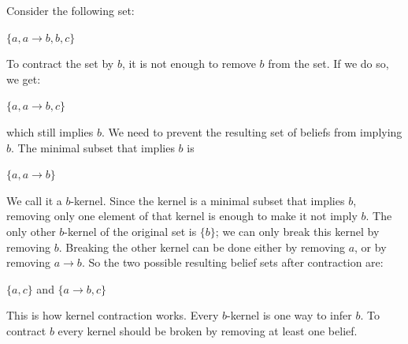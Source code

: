 \documentclass{sfuthesis}
\theoremstyle{plain}
\theoremstyle{definition}
\begin{document}
Consider the following set:
\begin{center}
$ \lbrace a, a \rightarrow b, b, c \rbrace $
\end{center}
To contract the set by $b$, it is not enough to remove $b$ from the set. If we do so, we get:
\begin{center}
$ \lbrace a, a \rightarrow b, c \rbrace $
\end{center}
which still implies $b$. We need to prevent the resulting set of beliefs from implying $b$. The minimal subset that implies $b$ is 
\begin{center}
$ \lbrace a, a \rightarrow b \rbrace $
\end{center}
We call it a $b$-kernel. Since the kernel is a minimal subset that implies $b$, removing only one element of that kernel is enough to make it not imply $b$. The only other $b$-kernel of the original set is $\lbrace b \rbrace$; we can only break this kernel by removing $b$. Breaking the other kernel can be done either by removing $a$, or by removing $a \rightarrow b$. So the two possible resulting belief sets after contraction are:
\begin{center}
$ \lbrace a, c \rbrace $ and $ \lbrace a \rightarrow b, c \rbrace $
\end{center}
This is how kernel contraction works. Every $b$-kernel is one way to infer $b$. To contract $b$ every kernel should be broken by removing at least one belief. 
\end{document}
